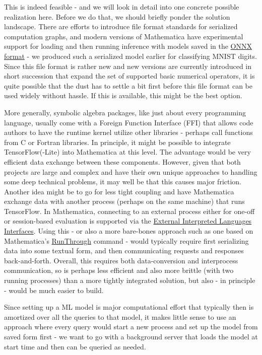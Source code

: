 \documentclass[11pt]{article}
\begin{document}
This is indeed feasible - and we will look in detail into one concrete
possible realization here. Before we do that, we should briefly ponder
the solution landscape. There are efforts to introduce file format
standards for serialized computation graphs, and modern versions of
Mathematica have experimental support for loading and then running
inference with models saved in the
\href{https://onnx.ai/about.html}{ONNX format} - we produced such a
serialized model earlier for classifying MNIST digits. Since this file
format is rather new and new versions are currently introduced in short
succession that expand the set of supported basic numerical operators,
it is quite possible that the dust has to settle a bit first before this
file format can be used widely without hassle. If this is available,
this might be the best option.

More generally, symbolic algebra packages, like just about every
programming language, usually come with a Foreign Function Interface
(FFI) that allows code authors to have the runtime kernel utilize other
libraries - perhaps call functions from C or Fortran libraries. In
principle, it might be possible to integrate TensorFlow(-Lite) into
Mathematica at this level. The advantage would be very efficient data
exchange between these components. However, given that both projects are
large and complex and have their own unique approaches to handling some
deep technical problems, it may well be that this causes major friction.
Another idea might be to go for less tight coupling and have Mathematica
exchange data with another process (perhaps on the same machine) that
runs TensorFlow. In Mathematica, connecting to an external process
either for one-off or session-based evaluation is supported via the
\href{https://reference.wolfram.com/language/guide/ExternalInterpretedLanguageInterfaces.html}{External
Interpreted Languages Interfaces}. Using this - or also a more
bare-bones approach such as one based on Mathematica's
\href{https://reference.wolfram.com/language/ref/RunThrough.html}{RunThrough}
command - would typically require first serializing data into some
textual form, and then communicating requests and responses
back-and-forth. Overall, this requires both data-conversion and
interprocess communication, so is perhaps less efficient and also more
brittle (with two running processes) than a more tightly integrated
solution, but also - in principle - would be much easier to build.

Since setting up a ML model is major computational effort that typically
then is amortized over all the queries to that model, it makes little
sense to use an approach where every query would start a new process and
set up the model from saved form first - we want to go with a background
server that loads the model at start time and then can be queried as
needed.
\end{document}
